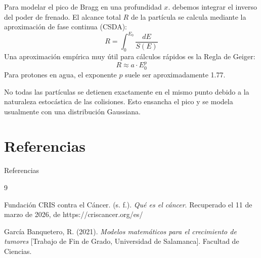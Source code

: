 \documentclass{beamer}
\begin{document}
\begin{frame}
    Para modelar el pico de Bragg en una profundidad $x$. debemos integrar el inverso del poder de frenado. El alcance total $R$ de la partícula se calcula mediante la aproximación de fase continua (CSDA):
    $$R = \int_{0}^{E_0} \frac{dE}{S(E)}$$Una aproximación empírica muy útil para cálculos rápidos es la Regla de Geiger:$$R \approx a \cdot E_0^p$$Para protones en agua, el exponente $p$ suele ser aproximadamente 1.77.
    \begin{block}
        No todas las partículas se detienen exactamente en el mismo punto debido a la naturaleza estocástica de las colisiones. Esto ensancha el pico y se modela usualmente con una distribución Gaussiana.
    \end{block}
\end{frame}




\section*
{Referencias}
\begin{frame}{Referencias}
\begin{thebibliography}{9}


Fundación CRIS contra el Cáncer. (s. f.). \textit{Qué es el cáncer}. Recuperado el 11 de marzo de 2026, de https://criscancer.org/es/

García Banquetero, R. (2021). \textit{Modelos matemáticos para el crecimiento de tumores} [Trabajo de Fin de Grado, Universidad de Salamanca]. Facultad de Ciencias.


\end{thebibliography}
    
\end{frame}
\end{document}
